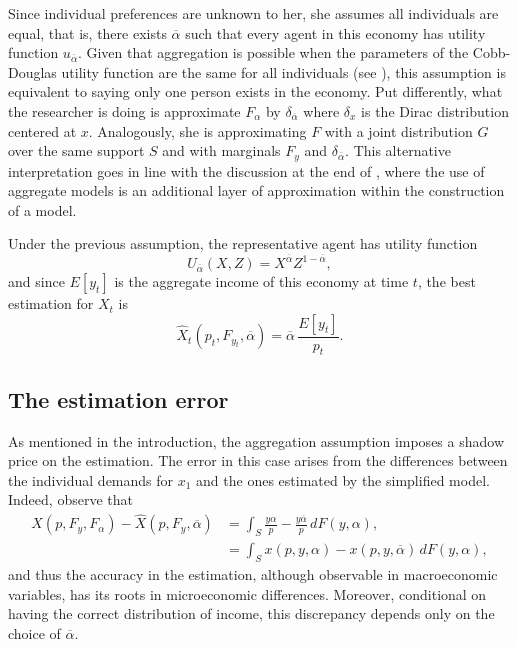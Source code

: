 \documentclass[english, a4paper, 12pt]{article}
\begin{document}
Since individual preferences are unknown to her, she assumes all individuals are equal, that is, there exists $\overline{\alpha}$ such that every agent in this economy has utility function $u_{\overline{\alpha}}$. Given that aggregation is possible when the parameters of the Cobb-Douglas utility function are the same for all individuals (see ), this assumption is equivalent to saying only one person exists in the economy. Put differently, what the researcher is doing is approximate $F_{\alpha}$ by $\delta_{\overline{\alpha}}$ where $\delta_{x}$ is the Dirac distribution centered at $x$. Analogously, she is approximating $F$ with a joint distribution $G$ over the same support $S$ and with marginals $F_{y}$ and $\delta_{\overline{\alpha}}$. This alternative interpretation goes in line with the discussion at the end of , where the use of aggregate models is an additional layer of approximation within the construction of a model.

Under the previous assumption, the representative agent has utility function
	$$U_{\overline{\alpha}}(X, Z) = X^{\overline{\alpha}}Z^{1-\overline{\alpha}},$$
and since $E[y_{t}]$ is the aggregate income of this economy at time $t$, the best estimation for $X_{t}$ is
	$$\widehat{X}_{t}(p_{t}, F_{y_{t}}, \overline{\alpha}) = \overline{\alpha}\, \frac{E[y_{t}]}{p_{t}}.$$

\subsection{The estimation error} \label{ssec:RepAgError}
As mentioned in the introduction, the aggregation assumption imposes a shadow price on the estimation. The error in this case arises from the differences between the individual demands for $x_{1}$ and the ones estimated by the simplified model. Indeed, observe that
	\begin{align*}
		X(p, F_{y}, F_{\alpha}) - \widehat{X}(p, F_{y}, \overline{\alpha})
			&=	\int_{S} \frac{y \alpha}{p} - \frac{y\overline{\alpha}}{p} \, dF(y,\alpha),	\\
			&=	\int_{S} x(p, y, \alpha) - x(p, y, \overline{\alpha}) \, dF(y,\alpha),
	\end{align*}
and thus the accuracy in the estimation, although observable in macroeconomic variables, has its roots in microeconomic differences. Moreover, conditional on having the correct distribution of income, this discrepancy depends only on the choice of $\overline{\alpha}$. 
\end{document}
